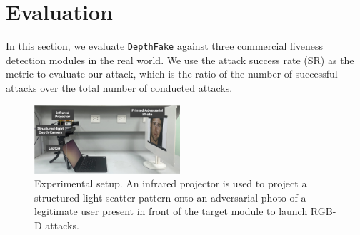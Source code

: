 \section{Evaluation}
\label{sec:evaluation}
In this section, we evaluate \texttt{DepthFake} against three commercial liveness detection modules in the real world. 
We use the attack success rate (SR) as the metric to evaluate our attack, which is the ratio of the number of successful attacks  over the total number of conducted attacks. 

\begin{figure}[pt]
	\centerline{\includegraphics[width = 0.48\textwidth]{figures/setup.png}}
	\caption{Experimental setup. An infrared projector is used to project a structured light scatter pattern onto an adversarial photo of a legitimate user present in front of the target module to launch RGB-D attacks.}
	\vspace{-0.1in}
	\label{setup}
\end{figure}

\begin{table}[pt]
	\small 
	\caption{Default parameters during evaluation}
	\vspace{-0.2in}
	\begin{center}
		\label{default_param}
	\end{center}
	\vspace{-0.15in}
\end{table}

